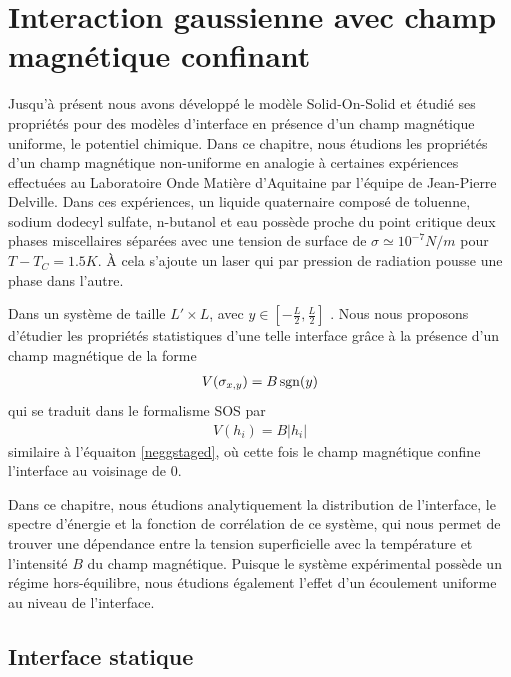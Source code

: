 \chapter{Interaction gaussienne avec champ magnétique confinant}
\label{sec_laser}

Jusqu'à présent nous avons développé le modèle Solid-On-Solid et étudié ses propriétés pour des modèles d'interface en présence d'un champ magnétique uniforme, le potentiel chimique. Dans ce chapitre, nous étudions les propriétés d'un champ magnétique non-uniforme en analogie à certaines expériences effectuées au Laboratoire Onde Matière d'Aquitaine par l'équipe de Jean-Pierre Delville. Dans ces expériences, un liquide quaternaire composé de toluenne, sodium dodecyl sulfate, n-butanol et eau possède proche du point critique deux phases miscellaires séparées avec une tension de surface de $\sigma \simeq 10^{-7}N/m$ pour $T-T_C=1.5K$\cite{casner_laser-induced_2003,delville_laser_2009,girot_conical_2019}. À cela s'ajoute un laser qui par pression de radiation pousse une phase dans l'autre. 

Dans un système de taille $L'\times L$, avec $y \in [-\frac{L}{2},\frac{L}{2}]$ . Nous nous proposons d'étudier les propriétés statistiques d'une telle interface grâce à la présence d'un champ magnétique de la forme 
\begin{align}
	V(\sigma_{x,y}) = B \operatorname{sgn}(y)
\end{align}
qui se traduit dans le formalisme SOS par
\begin{align}
    V(h_i) = B |h_i|
    \label{staged}
\end{align}
similaire à l'équaiton \ref{neggstaged}, où cette fois le champ magnétique confine l'interface au voisinage de $0$.

Dans ce chapitre, nous étudions analytiquement la distribution de l'interface, le spectre d'énergie et la fonction de corrélation de ce système, qui nous permet de trouver une dépendance entre la tension superficielle avec la température et l'intensité $B$ du champ magnétique. Puisque le système expérimental possède un régime hors-équilibre, nous étudions également l'effet d'un écoulement uniforme au niveau de l'interface. 

    \section{Interface statique}
